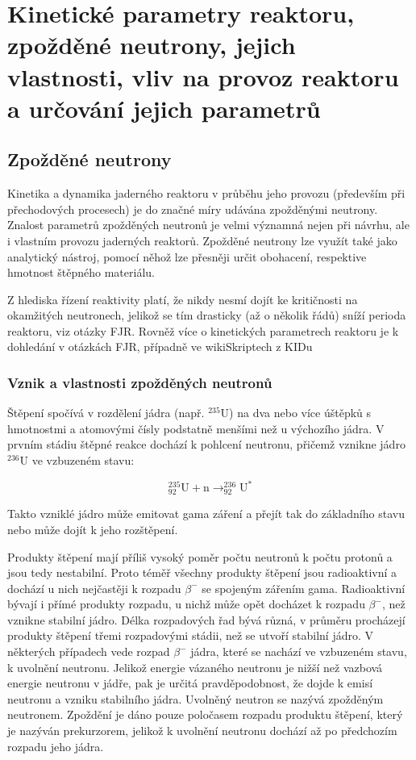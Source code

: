 \section[Měření kinetických parametrů]{Kinetické parametry reaktoru, zpožděné neutrony, jejich vlastnosti, vliv na provoz reaktoru a určování jejich parametrů}

\subsection{Zpožděné neutrony}

Kinetika a dynamika jaderného reaktoru v průběhu jeho provozu (především při přechodových procesech) je do značné míry udávána zpožděnými neutrony. Znalost parametrů zpožděných neutronů je velmi významná nejen při návrhu, ale i vlastním provozu jaderných reaktorů. Zpožděné neutrony lze využít také jako analytický nástroj, pomocí něhož lze přesněji určit obohacení, respektive hmotnost štěpného materiálu.

Z hlediska řízení reaktivity platí, že nikdy nesmí dojít ke kritičnosti na okamžitých neutronech, jelikož se tím drasticky (až o několik řádů) sníží perioda reaktoru, viz otázky FJR. Rovněž více o kinetických parametrech reaktoru je k dohledání v otázkách FJR, případně ve wikiSkriptech z KIDu

\subsubsection{Vznik a vlastnosti zpožděných neutronů}

Štěpení spočívá v rozdělení jádra (např. $^{235}\text{U}$) na dva nebo více úštěpků s hmotnostmi a atomovými čísly podstatně menšími než u výchozího jádra. V prvním stádiu štěpné reakce dochází k pohlcení neutronu, přičemž vznikne jádro $^{236}\text{U}$ ve vzbuzeném stavu:

\[
^{235}_{92}\text{U} + \text{n} \rightarrow ^{236}_{92}\text{U}^*
\]

Takto vzniklé jádro může emitovat gama záření a přejít tak do základního stavu nebo může dojít k jeho rozštěpení. 

Produkty štěpení mají příliš vysoký poměr počtu neutronů k počtu protonů a jsou tedy nestabilní. Proto téměř všechny produkty štěpení jsou radioaktivní a dochází u nich nejčastěji k rozpadu $\beta^-$ se spojeným zářením gama. Radioaktivní bývají i přímé produkty rozpadu, u nichž může opět docházet k rozpadu $\beta^-$, než vznikne stabilní jádro. Délka rozpadových řad bývá různá, v průměru procházejí produkty štěpení třemi rozpadovými stádii, než se utvoří stabilní jádro. V některých případech vede rozpad $\beta^-$ jádra, které se nachází ve vzbuzeném stavu, k uvolnění neutronu. Jelikož energie vázaného neutronu je nižší než vazbová energie neutronu v jádře, pak je určitá pravděpodobnost, že dojde k emisí neutronu a vzniku stabilního jádra. Uvolněný neutron se nazývá zpožděným neutronem. Zpoždění je dáno pouze poločasem rozpadu produktu štěpení, který je nazýván prekurzorem, jelikož k uvolnění neutronu dochází až po předchozím rozpadu jeho jádra.

